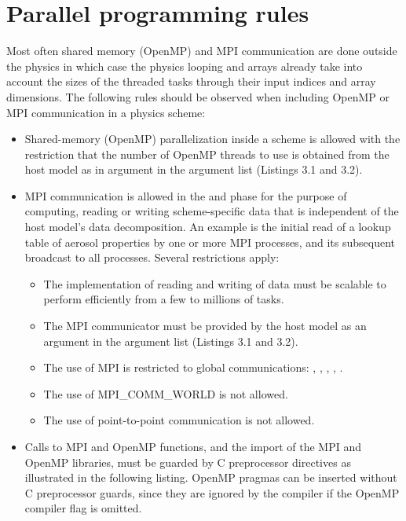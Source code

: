 \documentclass[letterpaper,10pt,english]{sphinxmanual}
\begin{document}
\section{Parallel programming rules}
\label{\detokenize{CompliantPhysicsParams:parallel-programming-rules}}
Most often shared memory (OpenMP) and MPI communication are done outside the physics in
which case the physics looping and arrays already take into account the sizes of the
threaded tasks through their input indices and array dimensions.  The following rules
should be observed when including OpenMP or MPI communication in a physics scheme:
\begin{itemize}
\item {} 
Shared-memory (OpenMP) parallelization inside a scheme is allowed with the restriction
that the number of OpenMP threads to use is obtained from the host model as in 
argument in the argument list (Listings 3.1 and 3.2).

\item {} 
MPI communication is allowed in the  and  phase for the purpose
of computing, reading or writing scheme-specific data that is independent of the host
model’s data decomposition. An example is the initial read of a lookup table of aerosol
properties by one or more MPI processes, and its subsequent broadcast to all processes.
Several restrictions apply:
\begin{itemize}
\item {} 
The implementation of reading and writing of data must be scalable to perform
efficiently from a few to millions of tasks.

\item {} 
The MPI communicator must be provided by the host model as an 
argument in the argument list (Listings 3.1 and 3.2).

\item {} 
The use of MPI is restricted to global communications: , ,
, , .

\item {} 
The use of MPI\_COMM\_WORLD is not allowed.

\item {} 
The use of point-to-point communication is not allowed.

\end{itemize}

\item {} 
Calls to MPI and OpenMP functions, and the import of the MPI and OpenMP libraries,
must be guarded by C preprocessor directives as illustrated in the following listing.
OpenMP pragmas can be inserted without C preprocessor guards, since they are ignored
by the compiler if the OpenMP compiler flag is omitted.

\end{itemize}
\end{document}
